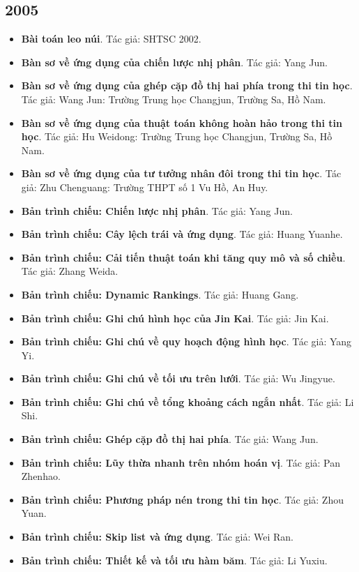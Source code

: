 \documentclass[11pt]{article}
\begin{document}
\subsection{2005}
\begin{itemize}[leftmargin=2em]
  \item \textbf{Bài toán leo núi}. Tác giả: SHTSC 2002.
  \item \textbf{Bàn sơ về ứng dụng của chiến lược nhị phân}. Tác giả: Yang Jun.
  \item \textbf{Bàn sơ về ứng dụng của ghép cặp đồ thị hai phía trong thi tin học}. Tác giả: Wang Jun: Trường Trung học Changjun, Trường Sa, Hồ Nam.
  \item \textbf{Bàn sơ về ứng dụng của thuật toán không hoàn hảo trong thi tin học}. Tác giả: Hu Weidong: Trường Trung học Changjun, Trường Sa, Hồ Nam.
  \item \textbf{Bàn sơ về ứng dụng của tư tưởng nhân đôi trong thi tin học}. Tác giả: Zhu Chenguang: Trường THPT số 1 Vu Hồ, An Huy.
  \item \textbf{Bản trình chiếu: Chiến lược nhị phân}. Tác giả: Yang Jun.
  \item \textbf{Bản trình chiếu: Cây lệch trái và ứng dụng}. Tác giả: Huang Yuanhe.
  \item \textbf{Bản trình chiếu: Cải tiến thuật toán khi tăng quy mô và số chiều}. Tác giả: Zhang Weida.
  \item \textbf{Bản trình chiếu: Dynamic Rankings}. Tác giả: Huang Gang.
  \item \textbf{Bản trình chiếu: Ghi chú hình học của Jin Kai}. Tác giả: Jin Kai.
  \item \textbf{Bản trình chiếu: Ghi chú về quy hoạch động hình học}. Tác giả: Yang Yi.
  \item \textbf{Bản trình chiếu: Ghi chú về tối ưu trên lưới}. Tác giả: Wu Jingyue.
  \item \textbf{Bản trình chiếu: Ghi chú về tổng khoảng cách ngắn nhất}. Tác giả: Li Shi.
  \item \textbf{Bản trình chiếu: Ghép cặp đồ thị hai phía}. Tác giả: Wang Jun.
  \item \textbf{Bản trình chiếu: Lũy thừa nhanh trên nhóm hoán vị}. Tác giả: Pan Zhenhao.
  \item \textbf{Bản trình chiếu: Phương pháp nén trong thi tin học}. Tác giả: Zhou Yuan.
  \item \textbf{Bản trình chiếu: Skip list và ứng dụng}. Tác giả: Wei Ran.
  \item \textbf{Bản trình chiếu: Thiết kế và tối ưu hàm băm}. Tác giả: Li Yuxiu.

\end{itemize}
\end{document}
